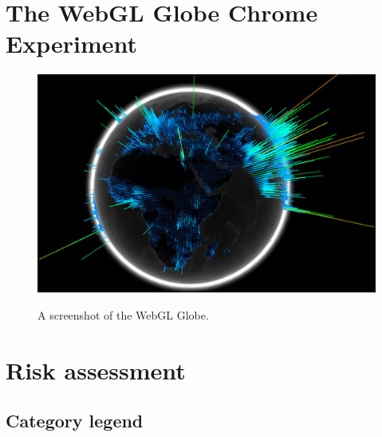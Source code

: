 \documentclass[a4paper]{article}
\begin{document}
	\newpage

		
	
	
	\newpage
	
	\begin{appendices}
	
		\section{The WebGL Globe Chrome Experiment} {
		\label{app:globe}
		
			\begin{figure}[H]
        		\href{https://www.chromeexperiments.com/globe}{\includegraphics[width=\textwidth]{images/globe}}
				\caption{A screenshot of the WebGL Globe. \citep{google2011globe}}
				\label{fig:webgl_globe}
			\end{figure}
		
		}
		
		\newpage
		
		\section{Risk assessment} {
		\label{app:risk_assessment}
		
			\subsection{Category legend} {
			\label{sec:category_legend}
			
}}
\end{appendices}
\end{document}
